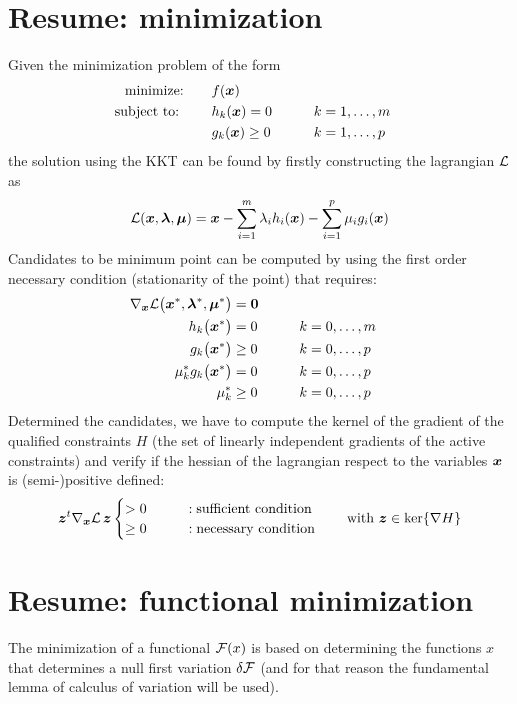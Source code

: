 \newpage
\section{Resume: minimization}
	Given the minimization problem of the form
	\begin{align*}
		\textrm{minimize:} \qquad & f(\boldsymbol{x}) \\
		\textrm{subject to:}\qquad  \ & h_k(\boldsymbol{x}) = 0 \qquad && k=1,\dots, m\\
		& g_k(\boldsymbol{x}) \geq 0  &&k = 1,\dots,p
	\end{align*}
	the solution using the KKT can be found by firstly constructing the lagrangian $\mathcal L $ as
	\[ \mathcal L(\boldsymbol{x}, \boldsymbol{\lambda}, \boldsymbol{\mu}) = \boldsymbol{x} - \sum_{i=1}^m \lambda_i h_i(\boldsymbol{x}) - \sum_{i=1}^p \mu_i g_i(\boldsymbol{x}) \]
	Candidates to be minimum point can be computed by using the first order necessary condition (stationarity of the point) that requires:	
	\begin{align*}
		\nabla_{\boldsymbol{x}} \mathcal L \big(\boldsymbol{x}^*,\boldsymbol{\lambda}^*,\boldsymbol{\mu}^*\big) & = \boldsymbol{0} \\
		h_k\big(\boldsymbol{x}^*\big) & =  0 \qquad && k = 0,\dots, m\\
		g_k\big(\boldsymbol{x}^*\big) & \geq 0 && k = 0,\dots, p \\
		\mu_k^* g_k\big(\boldsymbol{x}^*\big) & = 0 && k = 0,\dots, p \\
		\mu_k^* & \geq 0 && k = 0,\dots,p
	\end{align*}
	Determined the candidates, we have to compute the kernel of the gradient of the qualified constraints $H$ (the set of linearly independent gradients of the active constraints) and verify if the hessian of the lagrangian respect to the variables $\boldsymbol{x}$ is (semi-)positive defined:
	\[ \boldsymbol{z}^t \nabla_{\boldsymbol{x}} \mathcal L \, \boldsymbol{z}  \begin{cases}
		> 0 \qquad &:\textrm{sufficient condition} \\
		\geq 0 \qquad &:\textrm{necessary condition} 
	\end{cases} \qquad \textrm{with } \boldsymbol{z} \in \ker\{ \nabla H \} \]

\newpage
\section{Resume: functional minimization}
	The minimization of a functional $\mathcal{F}(x)$ is based on determining the functions $x$ that determines a null first variation $\delta \mathcal{F}$ (and for that reason the fundamental lemma of calculus of variation will be used).
	
